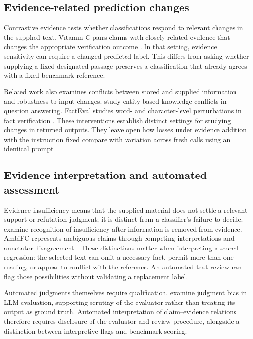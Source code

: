 \documentclass[11pt,letterpaper]{article}
\begin{document}
\subsection{Evidence-related prediction changes}
Contrastive evidence tests whether classifications respond to relevant changes in the supplied text. Vitamin C pairs claims with closely related evidence that changes the appropriate verification outcome \citep{schuster-etal-2021-get}. In that setting, evidence sensitivity can require a changed predicted label. This differs from asking whether supplying a fixed designated passage preserves a classification that already agrees with a fixed benchmark reference.

Related work also examines conflicts between stored and supplied information and robustness to input changes. \citet{longpre-etal-2021-entity} study entity-based knowledge conflicts in question answering. FactEval studies word- and character-level perturbations in fact verification \citep{mamta-cocarascu-2025-facteval}. These interventions establish distinct settings for studying changes in returned outputs. They leave open how losses under evidence addition with the instruction fixed compare with variation across fresh calls using an identical prompt.

\subsection{Evidence interpretation and automated assessment}
Evidence insufficiency means that the supplied material does not settle a relevant support or refutation judgment; it is distinct from a classifier's failure to decide. \citet{atanasova-etal-2022-fact} examine recognition of insufficiency after information is removed from evidence. AmbiFC represents ambiguous claims through competing interpretations and annotator disagreement \citep{glockner-etal-2024-ambifc}. These distinctions matter when interpreting a scored regression: the selected text can omit a necessary fact, permit more than one reading, or appear to conflict with the reference. An automated text review can flag those possibilities without validating a replacement label.

Automated judgments themselves require qualification. \citet{chen-etal-2024-humans} examine judgment bias in LLM evaluation, supporting scrutiny of the evaluator rather than treating its output as ground truth. Automated interpretation of claim--evidence relations therefore requires disclosure of the evaluator and review procedure, alongside a distinction between interpretive flags and benchmark scoring.
\end{document}
